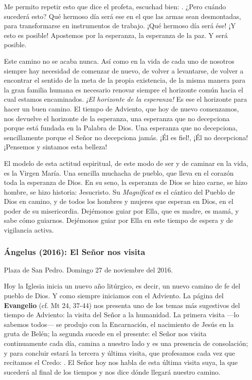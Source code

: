 Me permito repetir esto que dice el profeta, escuchad bien: . ¿Pero cuándo sucederá esto? Qué hermoso día será ese en el que las armas sean desmontadas, para transformarse en instrumentos de trabajo. ¡Qué hermoso día será ése! ¡Y esto es posible! Apostemos por la esperanza, la esperanza de la paz. Y será posible.

Este camino no se acaba nunca. Así como en la vida de cada uno de nosotros siempre hay necesidad de comenzar de nuevo, de volver a levantarse, de volver a encontrar el sentido de la meta de la propia existencia, de la misma manera para la gran familia humana es necesario renovar siempre el horizonte común hacia el cual estamos encaminados. \emph{¡El horizonte de la esperanza!} Es ese el horizonte para hacer un buen camino. El tiempo de Adviento, que hoy de nuevo comenzamos, nos devuelve el horizonte de la esperanza, una esperanza que no decepciona porque está fundada en la Palabra de Dios. Una esperanza que no decepciona, sencillamente porque el Señor no decepciona jamás. ¡Él es fiel!, ¡Él no decepciona! ¡Pensemos y sintamos esta belleza!

El modelo de esta actitud espiritual, de este modo de ser y de caminar en la vida, es la Virgen María. Una sencilla muchacha de pueblo, que lleva en el corazón toda la esperanza de Dios. En su seno, la esperanza de Dios se hizo carne, se hizo hombre, se hizo historia: Jesucristo. Su \emph{Magníficat} es el cántico del Pueblo de Dios en camino, y de todos los hombres y mujeres que esperan en Dios, en el poder de su misericordia. Dejémonos guiar por Ella, que es madre, es mamá, y sabe cómo guiarnos. Dejémonos guiar por Ella en este tiempo de espera y de vigilancia activa.

\subsubsection{Ángelus (2016): El Señor nos visita}

Plaza de San Pedro. Domingo 27 de noviembre del 2016.

Hoy la Iglesia inicia un nuevo año litúrgico, es decir, un nuevo camino de fe del pueblo de Dios. Y como siempre iniciamos con el Adviento. La página del \textbf{Evangelio} (cf. Mt 24, 37-44) nos presenta uno de los temas más sugestivos del tiempo de Adviento: la visita del Señor a la humanidad. La primera visita ---lo sabemos todos--- se produjo con la Encarnación, el nacimiento de Jesús en la gruta de Belén; la segunda sucede en el presente: el Señor nos visita continuamente cada día, camina a nuestro lado y es una presencia de consolación; y para concluir estará la tercera y última visita, que profesamos cada vez que recitamos el Credo: . El Señor hoy nos habla de esta última visita suya, la que sucederá al final de los tiempos y nos dice dónde llegará nuestro camino.

